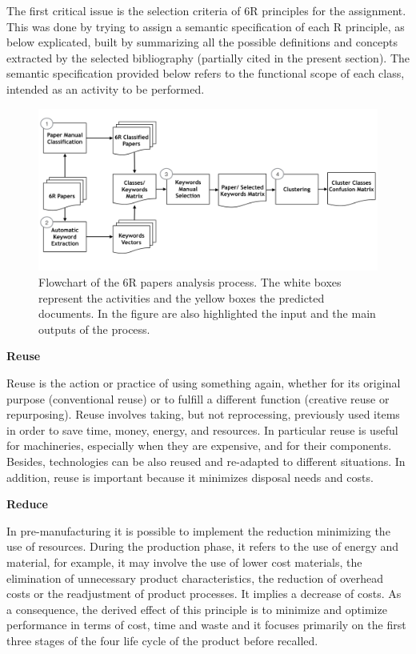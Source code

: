 \documentclass[b5paper,]{book}
\theoremstyle{definition}
\theoremstyle{definition}
\theoremstyle{definition}
\theoremstyle{remark}
\begin{document}
The first critical issue is the selection criteria of 6R principles for
the assignment. This was done by trying to assign a semantic
specification of each R principle, as below explicated, built by
summarizing all the possible definitions and concepts extracted by the
selected bibliography (partially cited in the present section). The
semantic specification provided below refers to the functional scope of
each class, intended as an activity to be performed.

\begin{figure}

{\centering \includegraphics[width=0.8\linewidth]{_bookdown_files/figures/workflow_sm} 

}

\caption{Flowchart of the 6R papers analysis process. The white boxes represent the activities and the yellow boxes the predicted documents. In the figure are also highlighted the input and the main outputs of the process.}\label{fig:wfsm}
\end{figure}

\textbf{Reuse}

Reuse is the action or practice of using something again, whether for
its original purpose (conventional reuse) or to fulfill a different
function (creative reuse or repurposing). Reuse involves taking, but not
reprocessing, previously used items in order to save time, money,
energy, and resources. In particular reuse is useful for machineries,
especially when they are expensive, and for their components. Besides,
technologies can be also reused and re-adapted to different situations.
In addition, reuse is important because it minimizes disposal needs and
costs.

\textbf{Reduce}

In pre-manufacturing it is possible to implement the reduction
minimizing the use of resources. During the production phase, it refers
to the use of energy and material, for example, it may involve the use
of lower cost materials, the elimination of unnecessary product
characteristics, the reduction of overhead costs or the readjustment of
product processes. It implies a decrease of costs. As a consequence, the
derived effect of this principle is to minimize and optimize performance
in terms of cost, time and waste and it focuses primarily on the first
three stages of the four life cycle of the product before recalled.
\end{document}
